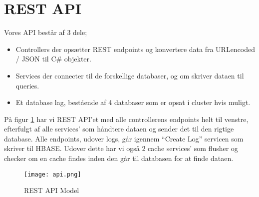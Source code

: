 \section{REST API}
\label{section:rest_api}
Vores API består af 3 dele;
\begin{itemize}
    \item Controllers der opsætter REST endpoints og konvertere data fra URLencoded / JSON til C\# objekter.
    \item Services der connecter til de forskellige databaser, og om skriver dataen til queries.
    \item Et database lag, bestående af 4 databaser som er opsat i cluster hvis muligt.
\end{itemize}
På figur \ref{fig::api} har vi REST API’et med alle controllerens endpoints helt til venstre, efterfulgt af alle services’ som håndtere dataen og sender det til den rigtige database. Alle endpoints, udover logs, går igennem “Create Log” servicen som skriver til HBASE. Udover dette har vi også 2 cache services’ som flusher og checker om en cache findes inden den går til databasen for at finde dataen.

\begin{figure}[H]
    \centering
    \texttt{[image: api.png]}
    \caption{REST API Model}
    \label{fig::api}
\end{figure}